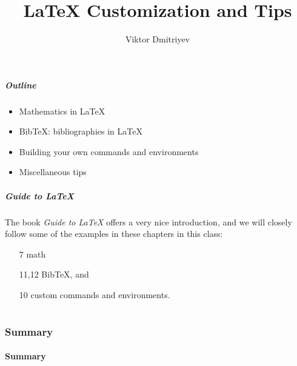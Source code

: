 \documentclass[slidestop,compress,mathserif]{beamer}
\title{LaTeX Customization and Tips}
\subtitle{}
\author{Viktor Dmitriyev}
\institute{Adapter from Mini Course on LaTeX by \href{https://github.com/OpenIntroOrg/mini-course-materials}{David Diez}}
\date{}
\begin{document}
\newenvironment{act}[1]{{\color{command}#1}}{}
\newcommand{\lcom}[1]{{\color{command}$\backslash$#1}}
\newcommand{\larg}[1]{{\color{braces}$\{${\color{black}#1}$\}$}}
\newcommand{\mathText}[1]{{\color{braces}\${\color{black}#1}\$}}


\frame{ \titlepage }

\begin{frame}
  \frametitle{Outline}
  \begin{itemize}
  \item Mathematics in LaTeX
  \item BibTeX: bibliographies in LaTeX
  \item Building your own commands and environments
  \item Miscellaneous tips
  \end{itemize}
\end{frame}

\begin{frame}  \frametitle{Guide to LaTeX}
The book \textit{Guide to LaTeX} offers a very nice introduction, and we will closely follow some of the examples in these chapters in this class:
\begin{itemize}
\item[7] math
\item[11,12] BibTeX, and
\item[10] custom commands and environments.
\end{itemize}
\end{frame}

\part{}



\section[Summary]{Summary}
\subsection[Summary]{Summary}
\end{document}
